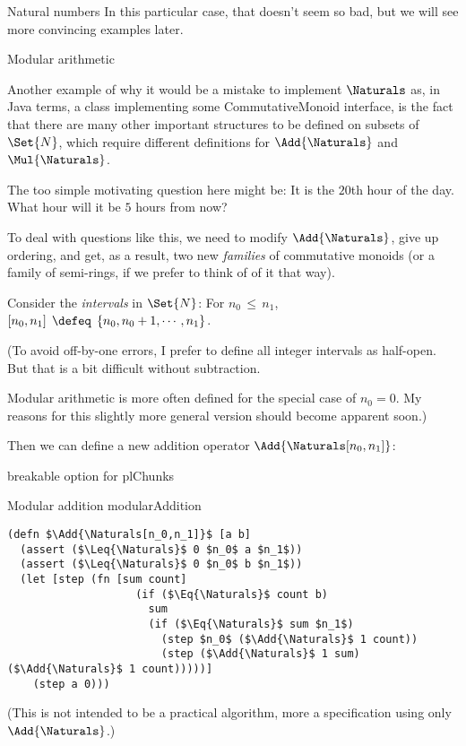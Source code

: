 \documentclass[12pt]{PalisadesLakesBook}
\begin{document}
\begin{plSection}{Natural numbers}
\TODO In this particular case, that doesn't seem so bad,
but we will see more convincing examples later.

\begin{plSection}{Modular arithmetic}

Another example of why it would be a mistake to implement
$\Naturals$ as, in Java terms,
a class implementing some {\javaFont CommutativeMonoid} interface,
is the fact that there are many other important structures
to be defined on subsets of $\Set{N}$, which require
different definitions for $\Add{\Naturals}$ and $\Mul{\Naturals}$.

The too simple motivating question here might be:
It is the $20$th hour of the day.
What hour will it be $5$ hours
from now?

To deal with questions like this, we need to modify 
$\Add{\Naturals}$,
give up ordering, and get, as a result, two new \emph{families} of 
commutative monoids (or a family of semi-rings, 
if we prefer to think of of it that way).

Consider the \emph{intervals} in $\Set{N}$:
For $n_{0}\,\leq\, n_{1}$, 
$\left[ n_{0}, n_{1} \right] \; \defeq \;
\left\{ n_{0}, n_{0} + 1, \cdots , n_{1} \right\}$.

(\NOTE To avoid off-by-one errors, 
I prefer to define all integer intervals as half-open.
But that is a bit difficult without subtraction.

\NOTE Modular arithmetic is more often defined for the special 
case of $n_0=0$.
My reasons for this slightly more general
version should become apparent soon.)

Then we can define a new addition operator 
$\Add{ \Naturals[n_0,n_1] }$:

\TODO breakable option for plChunks

\begin{plAlgorithm}
[breakable=false]
{Modular addition}
{modularAddition}
\begin{lstlisting}[language=pseudocode]
(defn $\Add{\Naturals[n_0,n_1]}$ [a b]
  (assert ($\Leq{\Naturals}$ 0 $n_0$ a $n_1$))
  (assert ($\Leq{\Naturals}$ 0 $n_0$ b $n_1$))
  (let [step (fn [sum count]
                    (if ($\Eq{\Naturals}$ count b)
                      sum
                      (if ($\Eq{\Naturals}$ sum $n_1$)
                        (step $n_0$ ($\Add{\Naturals}$ 1 count))
                        (step ($\Add{\Naturals}$ 1 sum) ($\Add{\Naturals}$ 1 count)))))]
    (step a 0)))
\end{lstlisting}
\end{plAlgorithm}
(\NOTE This is not intended to be a practical algorithm,
more a specification using only $\Add{\Naturals}$.)


\end{plSection}
\end{plSection}
\end{document}
